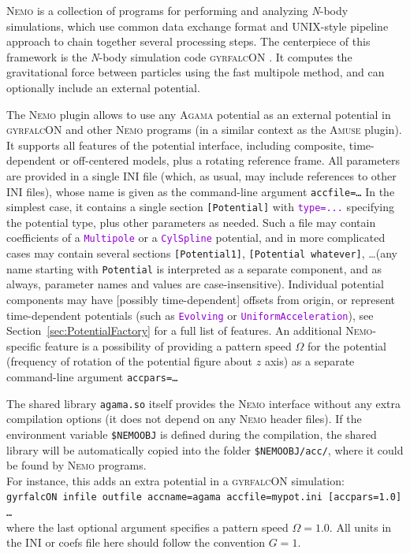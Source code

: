 \documentclass[12pt]{article}
\newcommand{\Agama}{\textsc{Agama}\xspace}
\newcommand{\Amuse}{\textsc{Amuse}\xspace}
\newcommand{\Nemo} {\textsc{Nemo}\xspace}
\newcommand{\Nbody}{\textsl{N}-body\xspace}
\newcommand{\ttt}[1]{\textcolor{darkviolet}{\texttt{#1}}}
\newcommand{\ppp}[1]{\textcolor{darkolive} {\texttt{#1}}}
\begin{document}
\Nemo \cite{Teuben1995} is a collection of programs for performing and analyzing \Nbody simulations, which use common data exchange format and UNIX-style pipeline approach to chain together several processing steps. The centerpiece of this framework is the \Nbody simulation code \textsc{gyrfalcON} \cite{Dehnen2000}. It computes the gravitational force between particles using the fast multipole method, and can optionally include an external potential.

The \Nemo plugin allows to use any \Agama potential as an external potential in \textsc{gyrfalcON} and other \Nemo programs (in a similar context as the \Amuse plugin). It supports all features of the potential interface, including composite, time-dependent or off-centered models, plus a rotating reference frame. 
All parameters are provided in a single INI file (which, as usual, may include references to other INI files), whose name is given as the command-line argument \texttt{accfile=\dots} In the simplest case, it contains a single section \ppp{[Potential]} with \ttt{type=...} specifying the potential type, plus other parameters as needed. Such a file may contain coefficients of a \ttt{Multipole} or a \ttt{CylSpline} potential, and in more complicated cases may contain several sections  \ppp{[Potential1]}, \ppp{[Potential whatever]}, \dots (any name starting with \ppp{Potential} is interpreted as a separate component, and as always, parameter names and values are case-insensitive). Individual potential components may have [possibly time-dependent] offsets from origin, or represent time-dependent potentials (such as \ttt{Evolving} or \ttt{UniformAcceleration}), see Section~\ref{sec:PotentialFactory} for a full list of features. An additional \Nemo-specific feature is a possibility of providing a pattern speed $\Omega$ for the potential (frequency of rotation of the potential figure about $z$ axis) as a separate command-line argument \texttt{accpars=\dots}

The shared library \texttt{agama.so} itself provides the \Nemo interface without any extra compilation options (it does not depend on any \Nemo header files). If the environment variable \texttt{\$NEMOOBJ} is defined during the compilation, the shared library will be automatically copied into the folder \texttt{\$NEMOOBJ/acc/}, where it could be found by \Nemo programs.\\
For instance, this adds an extra potential in a \textsc{gyrfalcON}  simulation:\\[2mm]
\texttt{gyrfalcON infile outfile accname=agama accfile=mypot.ini [accpars=1.0] \dots}\\[2mm]
where the last optional argument specifies a pattern speed $\Omega=1.0$. All units in the INI or coefs file here should follow the convention $G=1$.
\end{document}

